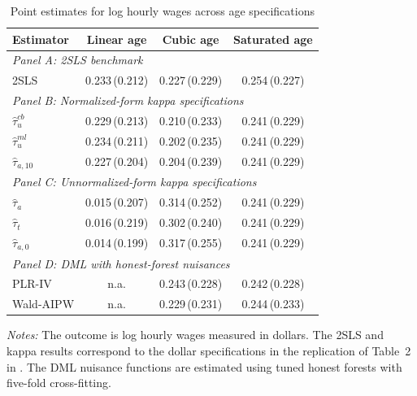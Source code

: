 \documentclass[12pt, a4paper, oneside]{article}
\theoremstyle{plain}
\theoremstyle{definition}
\begin{document}
\begin{table}[H]
\centering
\caption{Point estimates for log hourly wages across age specifications}
\label{tab:vietnam_point_estimates_age}
\small
\begin{threeparttable}
\begin{tabular}{@{}lccc@{}}
\toprule
Estimator
& Linear age
& Cubic age
& Saturated age \\
\midrule

\multicolumn{4}{l}{\textit{Panel A: 2SLS benchmark}} \\[2pt]

2SLS
& 0.233\,(0.212)
& 0.227\,(0.229)
& 0.254\,(0.227) \\[4pt]

\multicolumn{4}{l}{\textit{Panel B: Normalized-form kappa specifications}} \\[2pt]

$\hat{\tau}_{u}^{cb}$
& 0.229\,(0.213)
& 0.210\,(0.233)
& 0.241\,(0.229) \\

$\hat{\tau}_{u}^{ml}$
& 0.234\,(0.211)
& 0.202\,(0.235)
& 0.241\,(0.229) \\

$\hat{\tau}_{a,10}$
& 0.227\,(0.204)
& 0.204\,(0.239)
& 0.241\,(0.229) \\[4pt]

\multicolumn{4}{l}{\textit{Panel C: Unnormalized-form kappa specifications}} \\[2pt]

$\hat{\tau}_{a}$
& 0.015\,(0.207)
& 0.314\,(0.252)
& 0.241\,(0.229) \\

$\hat{\tau}_{t}$
& 0.016\,(0.219)
& 0.302\,(0.240)
& 0.241\,(0.229) \\

$\hat{\tau}_{a,0}$
& 0.014\,(0.199)
& 0.317\,(0.255)
& 0.241\,(0.229) \\[4pt]

\multicolumn{4}{l}{\textit{Panel D: DML with honest-forest nuisances}} \\[2pt]

PLR-IV
& n.a.
& 0.243\,(0.228)
& 0.242\,(0.228) \\

Wald-AIPW
& n.a.
& 0.229\,(0.231)
& 0.244\,(0.233) \\

\bottomrule
\end{tabular}

\begin{tablenotes}
\footnotesize
\item \textit{Notes:} The outcome is log hourly wages measured in
dollars. The 2SLS and kappa results correspond to the dollar specifications
in the replication of Table~2 in \citet{sloczynski2025abadie}. The DML
nuisance functions are estimated using tuned honest forests with five-fold
cross-fitting.  
\end{tablenotes}
\end{threeparttable}
\end{table}
\end{document}
